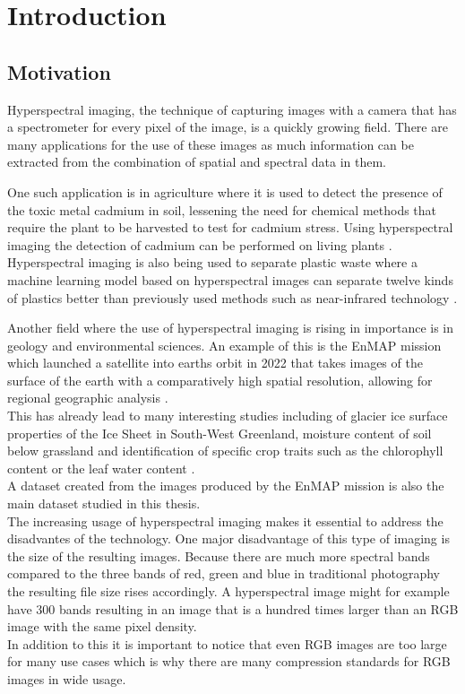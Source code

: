 \chapter{Introduction\label{cha:chapter1}}
\section{Motivation\label{sec:moti}}
Hyperspectral imaging, the technique of capturing images with a camera that has a spectrometer for every pixel of the image, is a quickly growing field. There are many applications for the use of these images as much information can be extracted from the combination of spatial and spectral data in them.

One such application is in agriculture where it is used to detect the presence of the toxic metal cadmium in soil, lessening the need for chemical methods that require the plant to be harvested to test for cadmium stress. Using hyperspectral imaging the detection of cadmium can be performed on living plants \citep{zea_leveraging_2022}.\\
Hyperspectral imaging is also being used to separate plastic waste where a machine learning model based on hyperspectral images can separate twelve kinds of plastics better than previously used methods such as near-infrared technology \citep{henriksen_plastic_2022}.

Another field where the use of hyperspectral imaging is rising in importance is in geology and environmental sciences. An example of this is the EnMAP mission which launched a satellite into earths orbit in 2022 that takes images of the surface of the earth with a comparatively high spatial resolution, allowing for regional geographic analysis \citep{guanter_enmap_2015}.\\
This has already lead to many interesting studies including of glacier ice surface properties of the Ice Sheet in South-West Greenland, moisture content of soil below grassland and identification of specific crop traits such as the chlorophyll content or the leaf water content \citep{bohn_glacier_2022}\citep{pascual-venteo_prototyping_2022}\citep{dopper_estimating_2022}.\\
A dataset created from the images produced by the EnMAP mission is also the main dataset studied in this thesis.\\
The increasing usage of hyperspectral imaging makes it essential to address the disadvantes of the technology. One major disadvantage of this type of imaging is the size of the resulting images. Because there are much more spectral bands compared to the three bands of red, green and blue in traditional photography the resulting file size rises accordingly. A hyperspectral image might for example have 300 bands resulting in an image that is a hundred times larger than an RGB image with the same pixel density.\\
In addition to this it is important to notice that even RGB images are too large for many use cases which is why there are many compression standards for RGB images in wide usage.

